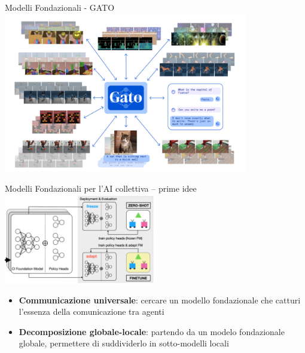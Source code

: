 \documentclass[presentation, 10pt,aspectratio=169]{beamer}\mode<presentation>{\usetheme{AMSBolognaFC}}
\begin{document}
\begin{frame}{Modelli Fondazionali - GATO}
	\centering
	\includegraphics[height=7cm]{img/gato.png}
\end{frame}
\begin{frame}{Modelli Fondazionali per l'AI collettiva -- prime idee}
\centering
\includegraphics[width=0.5\textwidth]{img/ci.png}
\begin{itemize}
	\item \textbf{Communicazione universale}: cercare un modello fondazionale che catturi l'essenza della comunicazione tra agenti
	\item \textbf{Decomposizione globale-locale}: partendo da un modelo fondazionale globale, permettere di suddividerlo in sotto-modelli locali
\end{itemize}
\end{frame}
\end{document}
